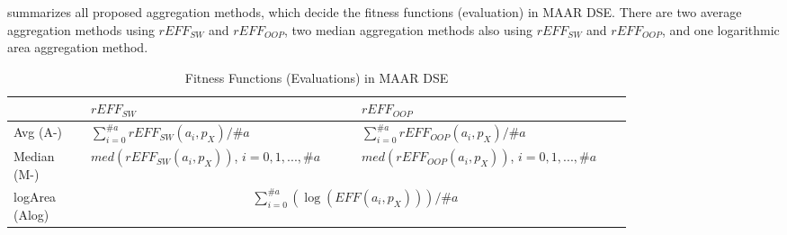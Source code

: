 
 summarizes all proposed aggregation methods, which decide the fitness functions (evaluation) in MAAR DSE. There are two average aggregation methods using $rEFF_{SW}$ and $rEFF_{OOP}$, two median aggregation methods also using $rEFF_{SW}$ and $rEFF_{OOP}$, and one logarithmic area aggregation method. 


\begin{table}[h]
	\caption{Fitness Functions (Evaluations) in MAAR DSE}
	\vspace{-8pt}
	\label{tab:fit}
	\centering
	\begin{tabular}{p{0.10\linewidth}|p{0.35\linewidth}|p{0.35\linewidth}}
		\toprule
		& $rEFF_{SW}$ & $rEFF_{OOP}$ \\
		\midrule
		\hline
		Avg (A-)& \(\displaystyle \sum_{i=0}^{\#a} rEFF_{SW}(a_{i}, p_{X})/\#a \) & \(\displaystyle\sum_{i=0}^{\#a} rEFF_{OOP}(a_{i}, p_{X})/\#a \)\\
		\hline
		
		Median (M-) & \(\displaystyle med(rEFF_{SW}(a_{i}, p_{X})) \),  $i = 0,1,...,\#a$  &	\(\displaystyle med(rEFF_{OOP}(a_{i}, p_{X})) \),  $i = 0,1,...,\#a$ \\
		
		\hline
		logArea (Alog)& \multicolumn{2}{c}{\(\displaystyle \sum_{i=0}^{\#a} ( \log (EFF(a_{i}, p_{X})) ) / \#a \)}\\
		\bottomrule
	\end{tabular}
\end{table}